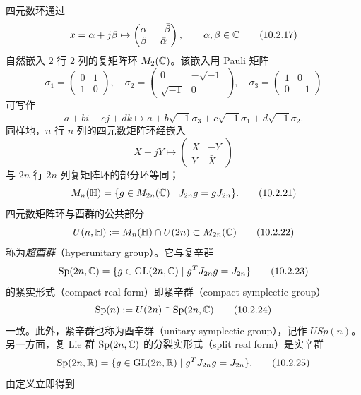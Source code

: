 四元数环通过
\begin{equation}
  x=\alpha+j\beta\mapsto\begin{pmatrix}\alpha&-\bar\beta\\ \beta&\bar\alpha\end{pmatrix},\qquad \alpha,\beta\in\mathbb{C} \tag{10.2.17}
\end{equation}
自然嵌入 $2$ 行 $2$ 列的复矩阵环 $M_2(\mathbb{C})$。该嵌入用 Pauli 矩阵
\begin{equation}
  \sigma_1=\begin{pmatrix}0&1\\1&0\end{pmatrix},\quad
  \sigma_2=\begin{pmatrix}0&-\sqrt{-1}\\\sqrt{-1}&0\end{pmatrix},\quad
  \sigma_3=\begin{pmatrix}1&0\\0&-1\end{pmatrix} \tag{10.2.18}
\end{equation}
可写作
\begin{equation}
  a+bi+cj+dk\mapsto a+b\sqrt{-1}\sigma_3+c\sqrt{-1}\sigma_1+d\sqrt{-1}\sigma_2. \tag{10.2.19}
\end{equation}
同样地，$n$ 行 $n$ 列的四元数矩阵环经嵌入
\begin{equation}
  X+jY\mapsto\begin{pmatrix}X&-\bar Y\\ Y&\bar X\end{pmatrix} \tag{10.2.20}
\end{equation}
与 $2n$ 行 $2n$ 列复矩阵环的部分环等同；
\begin{equation}
  M_n(\mathbb{H})=\{g\in M_{2n}(\mathbb{C})\mid J_{2n}g=\bar gJ_{2n}\}. \tag{10.2.21}
\end{equation}
四元数矩阵环与酉群的公共部分
\begin{equation}
  U(n,\mathbb{H}):=M_n(\mathbb{H})\cap U(2n)\subset M_{2n}(\mathbb{C}) \tag{10.2.22}
\end{equation}
称为\emph{超酉群}（hyperunitary group）。它与复辛群
\begin{equation}
  \operatorname{Sp}(2n,\mathbb{C})=\{g\in\operatorname{GL}(2n,\mathbb{C})\mid g^TJ_{2n}g=J_{2n}\} \tag{10.2.23}
\end{equation}
的紧实形式（compact real form）即紧辛群（compact symplectic group）
\begin{equation}
  \operatorname{Sp}(n):=U(2n)\cap\operatorname{Sp}(2n,\mathbb{C}) \tag{10.2.24}
\end{equation}
一致。此外，紧辛群也称为酉辛群（unitary symplectic group），记作 $USp(n)$。另一方面，复 Lie 群 $\operatorname{Sp}(2n,\mathbb{C})$ 的分裂实形式（split real form）是实辛群
\begin{equation}
  \operatorname{Sp}(2n,\mathbb{R})=\{g\in\operatorname{GL}(2n,\mathbb{R})\mid g^TJ_{2n}g=J_{2n}\}. \tag{10.2.25}
\end{equation}
由定义立即得到

